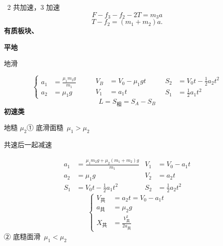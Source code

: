 \ 2 共加速，3 加速
\[
F-f_3-f_2-2T=m_3a
\]%
\[
T-f_2=(m_1+m_2)a.
\]
\textbf{有质板块、}

\textbf{平地}

\noindent 地滑

\[
\left\{\begin{aligned}
a_1&=\frac{\mu_1m_2g}{m_1}\\
a_2&=\mu_1g
\end{aligned}\right.
\qquad
\begin{aligned}
V_B&=V_0-\mu_1gt\\
V_1&=a_1t
\end{aligned}
\qquad
\begin{aligned}
S_2&=V_0t-\frac12a_2t^2\\
S_1&=\frac12a_1t^2
\end{aligned}
\]%
\[
L=S_{\text{相}}=S_A-S_B
\]%
\textbf{初速类}

\noindent 地糙 $\mu_2$\quad ① 底滑面糙\ $\mu_1>\mu_2$

\noindent 共速后一起减速

\begin{align*}
a_1&=\frac{\mu_1m_2g+\mu_2(m_1+m_2)g}{m_1} & V_1&=V_0-a_1t\\
a_2&=\mu_1g & V_2&=a_2t\\
S_1&=V_0t-\frac12a_1t^2 & S_2&=\frac12a_2t^2
\end{align*}
\[
\left\{\begin{aligned}
V_{\text{共}}&=a_2t=V_0-a_1t\\
a_{\text{共}}&=\mu_2g\\
X_{\text{共}}&=\frac{V_{\text{共}}^2}{2a_{\text{共}}}
\end{aligned}\right.
\]
\noindent ② 底糙面滑\ $\mu_1<\mu_2$

